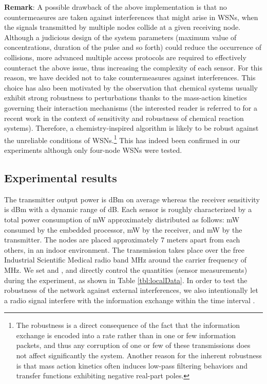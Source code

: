 \documentclass[journal]{IEEEtran}
\begin{document}
{{\bf{Remark}}: A possible drawback of the above implementation is that no countermeasures are taken against interferences that might arise in WSNs, when the signals transmitted by multiple nodes collide at a given receiving node. Although a judicious design of the system parameters (maximum value of concentrations, duration of the pulse and so forth) could reduce the occurrence of collisions, more advanced multiple access protocols are required to effectively counteract the above issue, thus increasing the complexity of each sensor. For this reason, we have decided not to take countermeasures against interferences. {This choice has also been motivated by the observation that chemical systems usually exhibit strong robustness to perturbations thanks to the mass-action kinetics governing their interaction mechanisms (the interested reader is referred to \cite{ShAl09} for a recent work in the context of sensitivity and robustness of chemical reaction systems). Therefore, a chemistry-inspired algorithm is likely to be robust against the unreliable conditions of WSNs.\footnote{{The robustness is a direct consequence of the fact that the information exchange is encoded into a rate rather than in one or few information packets, and thus any corruption of one or few of these transmissions does not affect significantly the system. Another reason for the inherent robustness is that mass action kinetics often induces low-pass filtering behaviors and transfer functions exhibiting negative real-part poles.}} {This has indeed been confirmed in our experiments although only four-node WSNs were tested}.}




\subsection{Experimental results}

The transmitter output power is  dBm on average whereas the receiver sensitivity is  dBm with a dynamic range of  dB. {Each sensor is roughly characterized by a total power consumption of  mW approximately distributed as follows:  mW consumed by the embedded processor,  mW by the receiver, and  mW by the transmitter. The nodes are placed approximately 7 meters apart from each others, in an indoor environment.}
The transmission takes place over the free Industrial Scientific Medical radio band  MHz around the carrier frequency of  MHz. We set   and  , and directly control the quantities  (sensor measurements) during the experiment, as shown in Table \ref{tbl:localData}. 
In order to test the robustness of the network against external interferences, we also intentionally let a radio signal interfere with the information exchange within the time interval .

}
\end{document}
